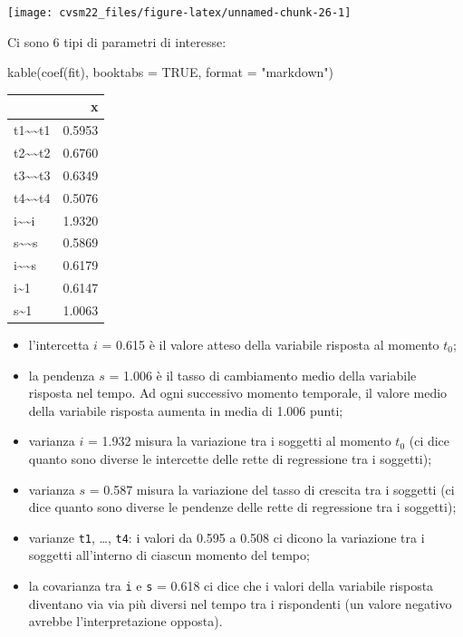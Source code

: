 \documentclass[
  11pt,
]{krantz}
\makeatletter
\newenvironment{Shaded}{\begin{snugshade}}{\end{snugshade}}
\newcommand{\AttributeTok}[1]{\textcolor[rgb]{0.61,0.61,0.61}{#1}}
\newcommand{\ConstantTok}[1]{\textcolor[rgb]{0,0,0}{#1}}
\newcommand{\FunctionTok}[1]{\textcolor[rgb]{0,0,0}{#1}}
\newcommand{\NormalTok}[1]{#1}
\newcommand{\StringTok}[1]{\textcolor[rgb]{0.5,0.5,0.5}{#1}}
\providecommand{\tightlist}{%
  \setlength{\itemsep}{0pt}\setlength{\parskip}{0pt}}
\newenvironment{kframe}{%
\medskip{}
\setlength{\fboxsep}{.8em}
 \def\at@end@of@kframe{}%
 \ifinner\ifhmode%
  \def\at@end@of@kframe{\end{minipage}}%
  \begin{minipage}{\columnwidth}%
 \fi\fi%
 \def\FrameCommand##1{\hskip\@totalleftmargin \hskip-\fboxsep
 \colorbox{shadecolor}{##1}\hskip-\fboxsep
     \hskip-\linewidth \hskip-\@totalleftmargin \hskip\columnwidth}%
 \MakeFramed {\advance\hsize-\width
   \@totalleftmargin\z@ \linewidth\hsize
   \@setminipage}}%
 {\par\unskip\endMakeFramed%
 \at@end@of@kframe}
\renewenvironment{Shaded}{\begin{kframe}}{\end{kframe}}
\theoremstyle{definition}
\theoremstyle{definition}
\theoremstyle{definition}
\theoremstyle{definition}
\theoremstyle{remark}
\makeatother
\begin{document}
\begin{center}\texttt{[image: cvsm22\_files/figure-latex/unnamed-chunk-26-1]} \end{center}

Ci sono 6 tipi di parametri di interesse:

\begin{Shaded}
\begin{Highlighting}[]
\FunctionTok{kable}\NormalTok{(}\FunctionTok{coef}\NormalTok{(fit), }\AttributeTok{booktabs =} \ConstantTok{TRUE}\NormalTok{, }\AttributeTok{format =} \StringTok{"markdown"}\NormalTok{)}
\end{Highlighting}
\end{Shaded}

\begin{longtable}[]{@{}lr@{}}
\toprule
& x \\
\midrule
\endhead
t1\textasciitilde\textasciitilde t1 & 0.5953 \\
t2\textasciitilde\textasciitilde t2 & 0.6760 \\
t3\textasciitilde\textasciitilde t3 & 0.6349 \\
t4\textasciitilde\textasciitilde t4 & 0.5076 \\
i\textasciitilde\textasciitilde i & 1.9320 \\
s\textasciitilde\textasciitilde s & 0.5869 \\
i\textasciitilde\textasciitilde s & 0.6179 \\
i\textasciitilde1 & 0.6147 \\
s\textasciitilde1 & 1.0063 \\
\bottomrule
\end{longtable}

\begin{itemize}
\tightlist
\item
  l'intercetta \(i\) = 0.615 è il valore atteso della variabile risposta al momento \(t_0\);
\item
  la pendenza \(s\) = 1.006 è il tasso di cambiamento medio della variabile risposta nel tempo. Ad ogni successivo momento temporale, il valore medio della variabile risposta aumenta in media di 1.006 punti;
\item
  varianza \(i\) = 1.932 misura la variazione tra i soggetti al momento \(t_0\) (ci dice quanto sono diverse le intercette delle rette di regressione tra i soggetti);
\item
  varianza \(s\) = 0.587 misura la variazione del tasso di crescita tra i soggetti (ci dice quanto sono diverse le pendenze delle rette di regressione tra i soggetti);
\item
  varianze \texttt{t1}, \ldots, \texttt{t4}: i valori da 0.595 a 0.508 ci dicono la variazione tra i soggetti all'interno di ciascun momento del tempo;
\item
  la covarianza tra \texttt{i} e \texttt{s} = 0.618 ci dice che i valori della variabile risposta diventano via via più diversi nel tempo tra i rispondenti (un valore negativo avrebbe l'interpretazione opposta).
\end{itemize}
\end{document}
